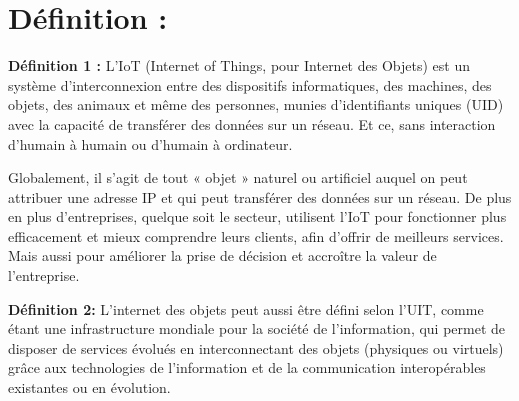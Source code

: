 \section{Définition :}

\textbf{Définition 1 :} L’IoT (Internet of Things, pour Internet des Objets) est un système d’interconnexion entre des dispositifs informatiques, des machines, des objets, des animaux et même des personnes, munies d’identifiants uniques (UID) avec la capacité de transférer des données sur un réseau. Et ce, sans interaction d’humain à humain ou d’humain à ordinateur. 

Globalement, il s’agit de tout « objet » naturel ou artificiel auquel on peut attribuer une adresse IP et qui peut transférer des données sur un réseau. De plus en plus d’entreprises, quelque soit le secteur, utilisent l’IoT pour fonctionner plus efficacement et mieux comprendre leurs clients, afin d’offrir de meilleurs services. Mais aussi pour améliorer la prise de décision et accroître la valeur de l’entreprise.

\textbf{Définition 2:} L’internet des objets peut aussi être défini selon l’UIT, comme étant une infrastructure mondiale pour la société de l’information, qui permet de disposer de services évolués en interconnectant des objets (physiques ou virtuels) grâce aux technologies de l’information et de la communication interopérables existantes ou en évolution.